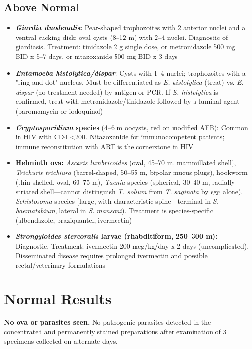 \subsection*{Above Normal}
\begin{itemize}
  \item \textbf{\textit{Giardia duodenalis}:} Pear-shaped trophozoites with 2 anterior nuclei and a ventral sucking disk; oval cysts (8--12 \textmu m) with 2--4 nuclei. Diagnostic of giardiasis. Treatment: tinidazole 2 g single dose, or metronidazole 500 mg BID x 5--7 days, or nitazoxanide 500 mg BID x 3 days
  \item \textbf{\textit{Entamoeba histolytica/dispar}:} Cysts with 1--4 nuclei; trophozoites with a "ring-and-dot" nucleus. Must be differentiated as \textit{E. histolytica} (treat) vs. \textit{E. dispar} (no treatment needed) by antigen or PCR. If \textit{E. histolytica} is confirmed, treat with metronidazole/tinidazole followed by a luminal agent (paromomycin or iodoquinol)
  \item \textbf{\textit{Cryptosporidium} species} (4--6 \textmu m oocysts, red on modified AFB): Common in HIV with CD4 <200. Nitazoxanide for immunocompetent patients; immune reconstitution with ART is the cornerstone in HIV \cite{checkley2015review}
  \item \textbf{Helminth ova:} \textit{Ascaris lumbricoides} (oval, 45--70 \textmu m, mammillated shell), \textit{Trichuris trichiura} (barrel-shaped, 50--55 \textmu m, bipolar mucus plugs), hookworm (thin-shelled, oval, 60--75 \textmu m), \textit{Taenia} species (spherical, 30--40 \textmu m, radially striated shell---cannot distinguish \textit{T. solium} from \textit{T. saginata} by egg alone), \textit{Schistosoma} species (large, with characteristic spine---terminal in \textit{S. haematobium}, lateral in \textit{S. mansoni}). Treatment is species-specific (albendazole, praziquantel, ivermectin)
  \item \textbf{\textit{Strongyloides stercoralis} larvae (rhabditiform, 250--300 \textmu m):} Diagnostic. Treatment: ivermectin 200 mcg/kg/day x 2 days (uncomplicated). Disseminated disease requires prolonged ivermectin and possible rectal/veterinary formulations
\end{itemize}

\section*{Normal Results}
\textbf{No ova or parasites seen.} No pathogenic parasites detected in the concentrated and permanently stained preparations after examination of 3 specimens collected on alternate days.

